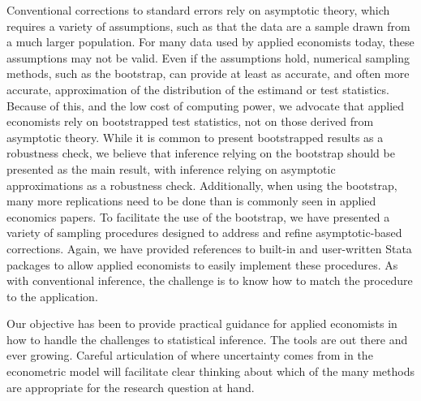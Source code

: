 \documentclass[11pt]{article}
\begin{document}
Conventional corrections to standard errors rely on asymptotic theory, which requires a variety of assumptions, such as that the data are a sample drawn from a much larger population. For many data used by applied economists today, these assumptions may not be valid. Even if the assumptions hold, numerical sampling methods, such as the bootstrap, can provide at least as accurate, and often more accurate, approximation of the distribution of the estimand or test statistics. Because of this, and the low cost of computing power, we advocate that applied economists rely on bootstrapped test statistics, not on those derived from asymptotic theory. While it is common to present bootstrapped results as a robustness check, we believe that inference relying on the bootstrap should be presented as the main result, with inference relying on asymptotic approximations as a robustness check. Additionally, when using the bootstrap, many more replications need to be done than is commonly seen in applied economics papers. To facilitate the use of the bootstrap, we have presented a variety of sampling procedures designed to address and refine asymptotic-based corrections. Again, we have provided references to built-in and user-written Stata packages to allow applied economists to easily implement these procedures. As with conventional inference, the challenge is to know how to match the procedure to the application.

Our objective has been to provide practical guidance for applied economists in how to handle the challenges to statistical inference. The tools are out there and ever growing. Careful articulation of where uncertainty comes from in the econometric model will facilitate clear thinking about which of the many methods are appropriate for the research question at hand.



\newpage
\singlespace
 

\end{document}
